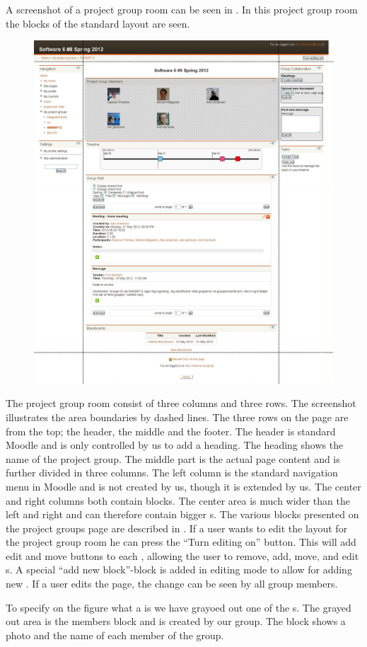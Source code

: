 

A screenshot of a project group room can be seen in . 
In this project group room the blocks of the standard layout are seen.
\begin{figure}[h]
	\centering
		\includegraphics[width=\textwidth]{images/projectgroupnoedit.png}
	\label{fig:projectgroupnoedit}
\end{figure}

The project group room consist of three columns and three rows. 
The screenshot illustrates the area boundaries by dashed lines. 
The three rows on the page are from the top; the header, the middle and the footer. 
The header is standard Moodle and is only controlled by us to add a heading. 
The heading shows the name of the project group. 
The middle part is the actual page content and is further divided in three columns. 
The left column is the standard navigation menu in Moodle and is not created by us, though it is extended by us.
The center and right columns both contain blocks.
The center area is much wider than the left and right and can therefore contain bigger \block{}s. 
The various blocks presented on the project groups page are described in . 
If a user wants to edit the layout for the project group room he can press the ``Turn editing on'' button. 
This will add edit and move buttons to each \block{}, allowing the user to remove, add, move, and edit \block{}s. 
A special ``add new block''-block is added in editing mode to allow for adding new \block[]. 
If a user edits the page, the change can be seen by all group members. 

To specify on the figure what a \block{} is we have grayoed out one of the \block{}s.
The grayed out area is the members block and is created by our group. 
The block shows a photo and the name of each member of the group. 



